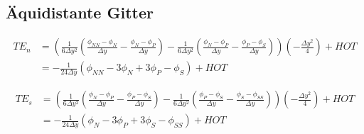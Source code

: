 \subsection{Äquidistante Gitter}

\begin{align*}
  {TE}_n &= \left({
\frac{1}{6\Delta y^2}
\left({\frac{\phi_{NN}-\phi_N}{\Delta y}-\frac{\phi_N-\phi_P}{\Delta y} }\right)
-\frac{1}{6\Delta y^2}
\left({\frac{\phi_N-\phi_P}{\Delta y} - \frac{\phi_P-\phi_S}{\Delta y}  }\right)
}\right)\left({-\frac{\Delta y^2}{4} }\right)+HOT\\
&= -\frac{1}{24\Delta y}\left({
\phi_{NN}-3\phi_N+3\phi_P-\phi_S}\right)+HOT
\end{align*}

\begin{align*}
  TE_s &=\left({
\frac{1}{6 \Delta y^2}
\left({\frac{\phi_N-\phi_P}{\Delta y}-\frac{\phi_P-\phi_S}{\Delta y} }\right)
-\frac{1}{6\Delta y^2}
\left({\frac{\phi_P-\phi_S}{\Delta y} - \frac{\phi_S-\phi_{SS}}{\Delta y}  }\right)
}\right)
\left({-\frac{\Delta y^2}{4} }\right)+HOT\\
&= -\frac{1}{24 \Delta y}\left({
\phi_N-3\phi_P+3\phi_S-\phi_{SS}}\right)+HOT
\end{align*}
